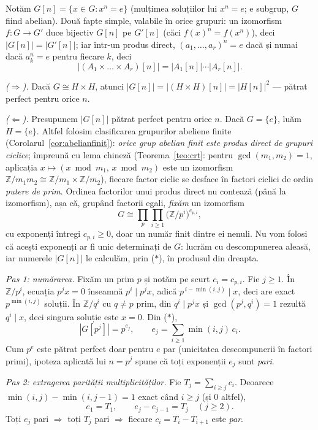 \begin{solutie}
Notăm $G[n]=\{x\in G:x^{n}=e\}$ (mulțimea soluțiilor lui
$x^{n}=e$; e subgrup, $G$ fiind
abelian). Două fapte simple, valabile în orice grupuri: un izomorfism
$f:G\to G'$ duce bijectiv $G[n]$ pe $G'[n]$ (căci $f(x)^{n}=f(x^{n})$),
deci $|G[n]|=|G'[n]|$; iar într-un produs direct,
$(a_{1},\dots,a_{r})^{n}=e$ dacă și numai dacă $a_{k}^{n}=e$ pentru
fiecare $k$, deci
\[
  \bigl|(A_{1}\times\dots\times A_{r})[n]\bigr|
  =|A_{1}[n]|\cdots|A_{r}[n]| . \tag{$\ast$}
\]

\smallskip
\textit{($\Rightarrow$).} Dacă $G\cong H\times H$, atunci
$|G[n]|=|(H\times H)[n]|=|H[n]|^{2}$ --- pătrat perfect pentru orice $n$.

\smallskip
\textit{($\Leftarrow$).} Presupunem $|G[n]|$ pătrat perfect pentru orice
$n$. Dacă $G=\{e\}$, luăm $H=\{e\}$. Altfel folosim clasificarea
grupurilor abeliene finite (Corolarul~\ref{cor:abelianfinit}):
\emph{orice grup abelian finit este produs direct de grupuri ciclice};
împreună cu lema chineză (Teorema~\ref{teo:crt}: pentru
$\gcd(m_1,m_2)=1$, aplicația $x\mapsto(x\bmod m_1,\,x\bmod m_2)$ este un
izomorfism $\mathbb{Z}/m_1m_2\cong\mathbb{Z}/m_1\times\mathbb{Z}/m_2$),
fiecare factor ciclic se desface în factori ciclici de ordin
\emph{putere de prim}. Ordinea factorilor unui produs direct nu contează
(până la izomorfism), așa că, grupând factorii egali, \emph{fixăm} un
izomorfism
\[
  G\cong\prod_{p}\prod_{i\ge 1}\bigl(\mathbb{Z}/p^{i}\bigr)^{c_{p,i}},
\]
cu exponenți întregi $c_{p,i}\ge 0$, doar un număr finit dintre ei
nenuli. Nu vom folosi că acești exponenți ar fi unic determinați de $G$:
lucrăm cu descompunerea aleasă, iar numerele $|G[n]|$ le calculăm, prin
($\ast$), în produsul din dreapta.

\textit{Pas 1: numărarea.} Fixăm un prim $p$ și notăm pe scurt
$c_{i}=c_{p,i}$. Fie $j\ge 1$. În $\mathbb{Z}/p^{i}$, ecuația
$p^{j}x=0$ înseamnă $p^{i}\mid p^{j}x$, adică $p^{\,i-\min(i,j)}\mid x$,
deci are exact $p^{\min(i,j)}$ soluții. În $\mathbb{Z}/q^{i}$ cu $q\neq p$
prim, din $q^{i}\mid p^{j}x$ și $\gcd(p^{j},q^{i})=1$ rezultă
$q^{i}\mid x$, deci singura soluție este $x=0$. Din ($\ast$),
\[
  |G[p^{j}]|=p^{e_{j}},\qquad e_{j}=\sum_{i\ge 1}\min(i,j)\,c_{i}.
\]
Cum $p^{e}$ este pătrat perfect doar pentru $e$ par (unicitatea
descompunerii în factori primi), ipoteza aplicată lui $n=p^{j}$ spune
că toți exponenții $e_{j}$ sunt \emph{pari}.

\textit{Pas 2: extragerea parității multiplicităților.} Fie
$T_{j}=\sum_{i\ge j}c_{i}$. Deoarece $\min(i,j)-\min(i,j-1)=1$ exact când
$i\ge j$ (și $0$ altfel),
\[
  e_{1}=T_{1},\qquad e_{j}-e_{j-1}=T_{j}\quad(j\ge 2).
\]
Toți $e_{j}$ pari $\Rightarrow$ toți $T_{j}$ pari $\Rightarrow$
fiecare $c_{i}=T_{i}-T_{i+1}$ este \emph{par}.


\end{solutie}
